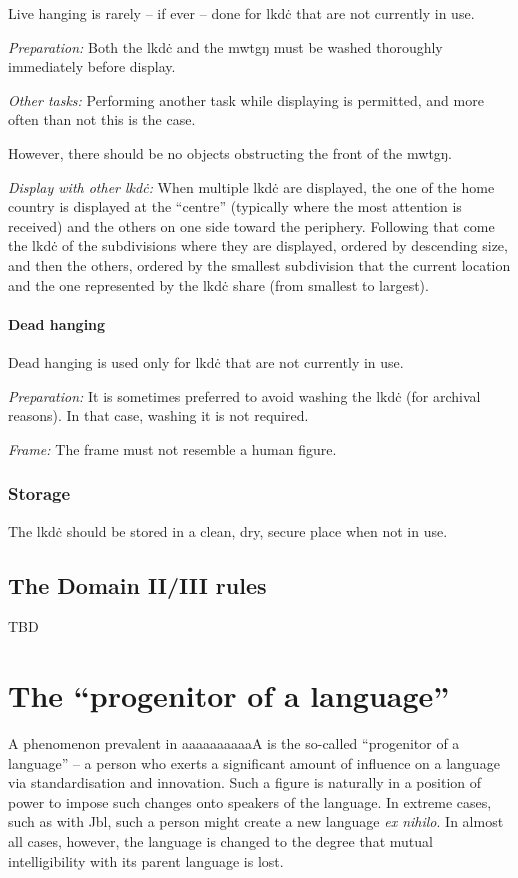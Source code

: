 \documentclass{book}
\newcommand{\wname}{aaaaaaaaaaA}
\begin{document}
Live hanging is rarely -- if ever -- done for lkdċ that are not currently in use.

\emph{Preparation:} Both the lkdċ and the mwtgŋ must be washed thoroughly immediately before display.

\emph{Other tasks:} Performing another task while displaying is permitted, and more often than not this is the case.

However, there should be no objects obstructing the front of the mwtgŋ.

\emph{Display with other lkdċ:} When multiple lkdċ are displayed, the one of the home country is displayed at the ``centre'' (typically where the most attention is received) and the others on one side toward the periphery. Following that come the lkdċ of the subdivisions where they are displayed, ordered by descending size, and then the others, ordered by the smallest subdivision that the current location and the one represented by the lkdċ share (from smallest to largest).

\subsubsection{Dead hanging}

Dead hanging is used only for lkdċ that are not currently in use.

\emph{Preparation:} It is sometimes preferred to avoid washing the lkdċ (for archival reasons). In that case, washing it is not required.

\emph{Frame:} The frame must not resemble a human figure.

\subsection{Storage}

The lkdċ should be stored in a clean, dry, secure place when not in use.

\section{The Domain II/III rules}

TBD

\chapter{The ``progenitor of a language''}

A phenomenon prevalent in \wname{} is the so-called ``progenitor of a language'' -- a person who exerts a significant amount of influence on a language via standardisation and innovation. Such a figure is naturally in a position of power to impose such changes onto speakers of the language. In extreme cases, such as with Jbl, such a person might create a new language \emph{ex nihilo}. In almost all cases, however, the language is changed to the degree that mutual intelligibility with its parent language is lost.
\end{document}
